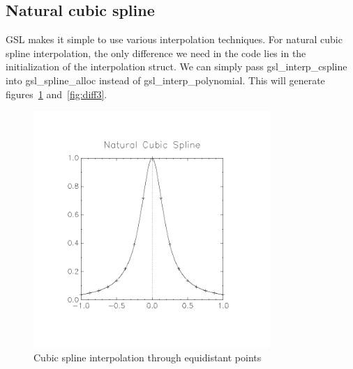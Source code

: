 \documentclass[11pt, a4paper, titlepage, openright]{article}
\begin{document}
\subsection{Natural cubic spline}
    GSL makes it simple to use various interpolation techniques. For natural cubic spline interpolation, the only difference
    we need in the code lies in the initialization of the interpolation struct. We can simply pass gsl\_interp\_cspline
    into gsl\_spline\_alloc instead of gsl\_interp\_polynomial. This will generate figures~\ref{fig:spline1}
    and~\ref{fig:diff3}.
    \begin{figure}[H]
        \centering
        \includegraphics[width=9cm, trim={2cm, 4cm, 2cm, 3cm}, clip]{../images/spline1}
        \caption{Cubic spline interpolation through equidistant points}
        \label{fig:spline1}
    \end{figure}
\end{document}
